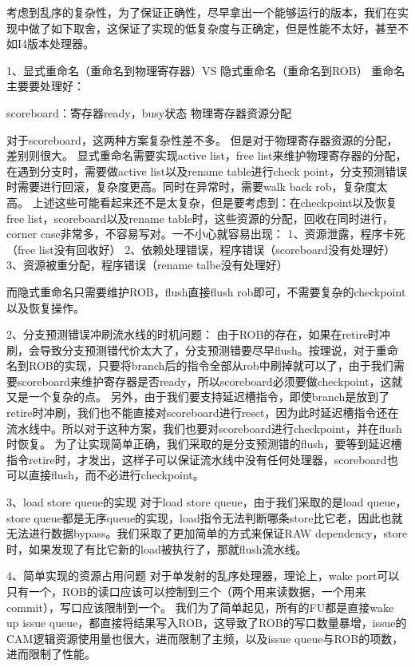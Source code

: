 \documentclass[lang=cn,11pt,a4paper]{elegantpaper}
\begin{document}
考虑到乱序的复杂性，为了保证正确性，尽早拿出一个能够运行的版本，我们在实现中做了如下取舍，这保证了实现的低复杂度与正确定，但是性能不太好，甚至不如I4版本处理器。


1、显式重命名（重命名到物理寄存器）VS 隐式重命名（重命名到ROB）
重命名主要要处理好：

scoreboard：寄存器ready，busy状态
物理寄存器资源分配

对于scoreboard，这两种方案复杂性差不多。
但是对于物理寄存器资源的分配，差别则很大。
显式重命名需要实现active list，free list来维护物理寄存器的分配，在遇到分支时，需要做active list以及rename table进行check point，分支预测错误时需要进行回滚，复杂度更高。同时在异常时，需要walk back rob，复杂度太高。
上述这些可能看起来还不是太复杂，但是要考虑到：在checkpoint以及恢复free list，scoreboard以及rename table时，这些资源的分配，回收在同时进行，corner case非常多，不容易写对。一不小心就容易出现：
1、资源泄露，程序卡死（free list没有回收好）
2、依赖处理错误，程序错误（scoreboard没有处理好）
3、资源被重分配，程序错误（rename talbe没有处理好）

而隐式重命名只需要维护ROB，flush直接flush rob即可，不需要复杂的checkpoint以及恢复操作。

2、分支预测错误冲刷流水线的时机问题：
由于ROB的存在，如果在retire时冲刷，会导致分支预测错代价太大了，分支预测错要尽早flush。按理说，对于重命名到ROB的实现，只要将branch后的指令全部从rob中刷掉就可以了，由于我们需要scoreboard来维护寄存器是否ready，所以scoreboard必须要做checkpoint，这就又是一个复杂的点。
另外，由于我们要支持延迟槽指令，即使branch是放到了retire时冲刷，我们也不能直接对scoreboard进行reset，因为此时延迟槽指令还在流水线中。所以对于这种方案，我们也要对scoreboard进行checkpoint，并在flush时恢复。
为了让实现简单正确，我们采取的是分支预测错的flush，要等到延迟槽指令retire时，才发出，这样子可以保证流水线中没有任何处理器，scoreboard也可以直接flush，而不必进行checkpoint。

3、load store queue的实现
对于load store queue，由于我们采取的是load queue，store queue都是无序queue的实现，load指令无法判断哪条store比它老，因此也就无法进行数据bypass。我们采取了更加简单的方式来保证RAW dependency，store时，如果发现了有比它新的load被执行了，那就flush流水线。

4、简单实现的资源占用问题
对于单发射的乱序处理器，理论上，wake port可以只有一个，ROB的读口应该可以控制到三个（两个用来读数据，一个用来commit），写口应该限制到一个。
我们为了简单起见，所有的FU都是直接wake up issue queue，都直接将结果写入ROB，这导致了ROB的写口数量暴增，issue的CAM逻辑资源使用量也很大，进而限制了主频，以及issue queue与ROB的项数，进而限制了性能。
\end{document}
